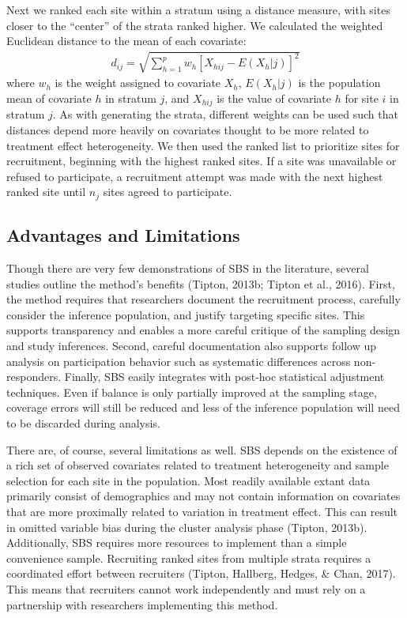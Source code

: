 \documentclass[man,floatsintext]{apa6}
\begin{document}
Next we ranked each site within a stratum using a distance measure, with sites closer to the \enquote{center} of the strata ranked higher. We calculated the weighted Euclidean distance to the mean of each covariate:
\begin{align} \label{eq:euclid}
d_{ij} = \sqrt{\sum^p_{h=1}w_h[X_{hij} - E(X_h|j)]^2}
\end{align}
where \(w_h\) is the weight assigned to covariate \(X_h\), \(E(X_h|j)\) is the population mean of covariate \(h\) in stratum \(j\), and \(X_{hij}\) is the value of covariate \(h\) for site \(i\) in stratum \(j\). As with generating the strata, different weights can be used such that distances depend more heavily on covariates thought to be more related to treatment effect heterogeneity. We then used the ranked list to prioritize sites for recruitment, beginning with the highest ranked sites. If a site was unavailable or refused to participate, a recruitment attempt was made with the next highest ranked site until \(n_j\) sites agreed to participate.

\hypertarget{advantages-and-limitations}{%
\subsection{Advantages and Limitations}\label{advantages-and-limitations}}

Though there are very few demonstrations of SBS in the literature, several studies outline the method's benefits (Tipton, 2013b; Tipton et al., 2016). First, the method requires that researchers document the recruitment process, carefully consider the inference population, and justify targeting specific sites. This supports transparency and enables a more careful critique of the sampling design and study inferences. Second, careful documentation also supports follow up analysis on participation behavior such as systematic differences across non-responders. Finally, SBS easily integrates with post-hoc statistical adjustment techniques. Even if balance is only partially improved at the sampling stage, coverage errors will still be reduced and less of the inference population will need to be discarded during analysis.

There are, of course, several limitations as well. SBS depends on the existence of a rich set of observed covariates related to treatment heterogeneity and sample selection for each site in the population. Most readily available extant data primarily consist of demographics and may not contain information on covariates that are more proximally related to variation in treatment effect. This can result in omitted variable bias during the cluster analysis phase (Tipton, 2013b). Additionally, SBS requires more resources to implement than a simple convenience sample. Recruiting ranked sites from multiple strata requires a coordinated effort between recruiters (Tipton, Hallberg, Hedges, \& Chan, 2017). This means that recruiters cannot work independently and must rely on a partnership with researchers implementing this method.
\end{document}
